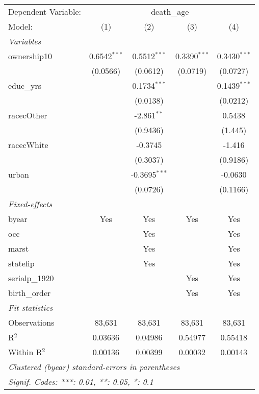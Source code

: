 
\begingroup
\centering
\begin{tabular}{lcccc}
   \tabularnewline \midrule \midrule
   Dependent Variable: & \multicolumn{4}{c}{death\_age}\\
   Model:         & (1)            & (2)             & (3)            & (4)\\  
   \midrule
   \emph{Variables}\\
   ownership10    & 0.6542$^{***}$ & 0.5512$^{***}$  & 0.3390$^{***}$ & 0.3430$^{***}$\\   
                  & (0.0566)       & (0.0612)        & (0.0719)       & (0.0727)\\   
   educ\_yrs      &                & 0.1734$^{***}$  &                & 0.1439$^{***}$\\   
                  &                & (0.0138)        &                & (0.0212)\\   
   racecOther     &                & -2.861$^{**}$   &                & 0.5438\\   
                  &                & (0.9436)        &                & (1.445)\\   
   racecWhite     &                & -0.3745         &                & -1.416\\   
                  &                & (0.3037)        &                & (0.9186)\\   
   urban          &                & -0.3695$^{***}$ &                & -0.0630\\   
                  &                & (0.0726)        &                & (0.1166)\\   
   \midrule
   \emph{Fixed-effects}\\
   byear          & Yes            & Yes             & Yes            & Yes\\  
   occ            &                & Yes             &                & Yes\\  
   marst          &                & Yes             &                & Yes\\  
   statefip       &                & Yes             &                & Yes\\  
   serialp\_1920  &                &                 & Yes            & Yes\\  
   birth\_order   &                &                 & Yes            & Yes\\  
   \midrule
   \emph{Fit statistics}\\
   Observations   & 83,631         & 83,631          & 83,631         & 83,631\\  
   R$^2$          & 0.03636        & 0.04986         & 0.54977        & 0.55418\\  
   Within R$^2$   & 0.00136        & 0.00399         & 0.00032        & 0.00143\\  
   \midrule \midrule
   \multicolumn{5}{l}{\emph{Clustered (byear) standard-errors in parentheses}}\\
   \multicolumn{5}{l}{\emph{Signif. Codes: ***: 0.01, **: 0.05, *: 0.1}}\\
\end{tabular}
\par\endgroup


